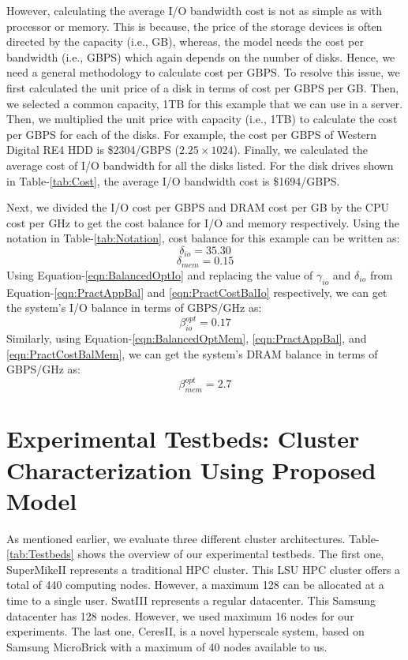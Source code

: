 \documentclass[journal]{IEEEtran}
\begin{document}
However, calculating the average I/O bandwidth cost is not as simple as with processor or memory. This is because, the price of the storage devices is often directed by the capacity (i.e., GB), whereas, the model needs the cost per bandwidth (i.e., GBPS) which again depends on the number of disks. Hence, we need a general methodology to calculate cost per GBPS. To resolve this issue, we first calculated the unit price of a disk in terms of cost per GBPS per GB. Then, we selected a common capacity, 1TB for this example that we can use in a server.  Then, we multiplied the unit price with capacity (i.e., 1TB) to calculate the cost per GBPS for each of the disks. For example, the cost per GBPS of Western Digital RE4 HDD is \$2304/GBPS ($2.25 \times 1024$). Finally, we calculated the average cost of I/O bandwidth for all the disks listed. For the disk drives shown in Table-\ref{tab:Cost}, the average I/O bandwidth cost is \$1694/GBPS. 

Next, we divided the I/O cost per GBPS  and DRAM cost per GB by the CPU cost per GHz to get the cost balance for I/O and memory respectively. Using the notation in Table-\ref{tab:Notation}, cost balance for this example can be written as: 
\begin{equation} \label{eqn:PractCostBalIo}
\delta_{io} = 35.30 
\end{equation}
\begin{equation} \label{eqn:PractCostBalMem}
\delta_{mem} = 0.15
\end{equation}
Using Equation-\ref{eqn:BalancedOptIo} and replacing the value of $\gamma_{io}$ and $\delta_{io}$ from Equation-\ref{eqn:PractAppBal} and \ref{eqn:PractCostBalIo} respectively, we can get the system's I/O balance in terms of GBPS/GHz as:
\begin{equation} \label{eqn:PractSysBalIo}
\beta_{io}^{opt} = 0.17
\end{equation}
Similarly, using Equation-\ref{eqn:BalancedOptMem}, \ref{eqn:PractAppBal}, and \ref{eqn:PractCostBalMem}, we can get the system's DRAM balance in terms of GBPS/GHz as:
\begin{equation} \label{eqn:PractSysBalMem}
\beta_{mem}^{opt} = 2.7
\end{equation} 

\section{Experimental Testbeds: Cluster Characterization Using Proposed Model} \label{sec:ExperimentalTestbed}
As mentioned earlier, we evaluate three different cluster architectures. Table-\ref{tab:Testbeds} shows the overview of our experimental testbeds. The first one, SuperMikeII represents a traditional HPC cluster. This LSU HPC cluster offers a total of 440 computing nodes. However, a maximum 128 can be allocated at a time to a single user. SwatIII represents a regular datacenter. This Samsung datacenter has 128 nodes. However, we used maximum 16 nodes for our experiments. The last one, CeresII, is a novel hyperscale system, based on Samsung MicroBrick with a maximum of 40 nodes available to us.
\end{document}
